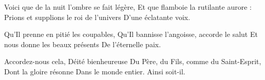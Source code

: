 Voici que de la nuit l'ombre se fait légère,
Et que flamboie la rutilante aurore :
Prions et supplions le roi de l'univers
D'une éclatante voix.

Qu'Il prenne en pitié les coupables,
Qu'Il bannisse l'angoisse, accorde le salut
Et nous donne les beaux présents
De l'éternelle paix.

Accordez-nous cela, Déité bienheureuse
Du Père, du Fils, comme du Saint-Esprit,
Dont la gloire résonne
Dans le monde entier.
Ainsi soit-il.